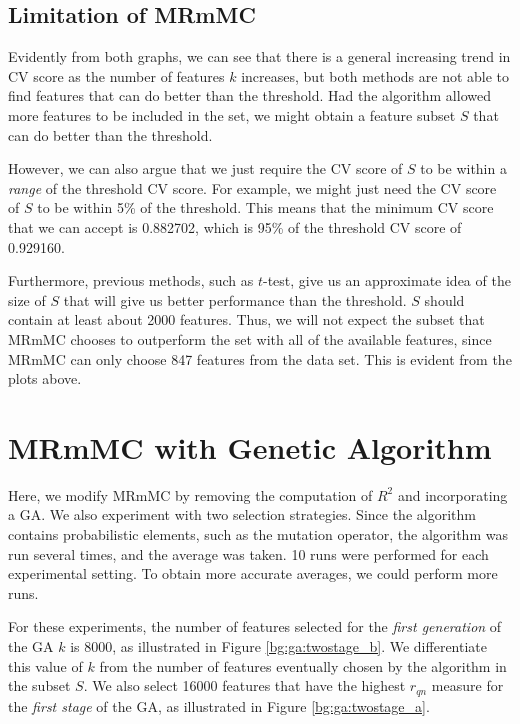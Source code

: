 \documentclass[12pt, twoside, a4paper]{report}
\begin{document}
\subsection{Limitation of MRmMC}

Evidently from both graphs, we can see that there is a general increasing trend in CV score as the number of features $k$ increases, but both methods are not able to find features that can do better than the threshold. Had the algorithm allowed more features to be included in the set, we might obtain a feature subset $S$ that can do better than the threshold.

However, we can also argue that we just require the CV score of $S$ to be within a \textit{range} of the threshold CV score. For example, we might just need the CV score of $S$ to be within 5\% of the threshold. This means that the minimum CV score that we can accept is 0.882702, which is 95\% of the threshold CV score of 0.929160.

Furthermore, previous methods, such as $t$-test, give us an approximate idea of the size of $S$ that will give us better performance than the threshold. $S$ should contain at least about 2000 features. Thus, we will not expect the subset that MRmMC chooses to outperform the set with all of the available features, since MRmMC can only choose 847 features from the data set. This is evident from the plots above.



\section{MRmMC with Genetic Algorithm} \label{mrmmc_ga_results}

Here, we modify MRmMC by removing the computation of $R^2$ and incorporating a GA. We also experiment with two selection strategies. Since the algorithm contains probabilistic elements, such as the mutation operator, the algorithm was run several times, and the average was taken. 10 runs were performed for each experimental setting. To obtain more accurate averages, we could perform more runs.

For these experiments, the number of features selected for the \textit{first generation} of the GA $k$ is 8000, as illustrated in Figure \ref{bg:ga:twostage_b}. We differentiate this value of $k$ from the number of features eventually chosen by the algorithm in the subset $S$. We also select 16000 features that have the highest $r_{qn}$ measure for the \textit{first stage} of the GA, as illustrated in Figure \ref{bg:ga:twostage_a}.
\end{document}
